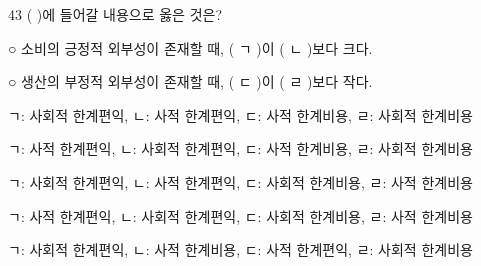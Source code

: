 \begin{question}{43}
( )에 들어갈 내용으로 옳은 것은?
\begin{framedtext}
○ 소비의 긍정적 외부성이 존재할 때, ( ㄱ )이 ( ㄴ )보다 크다. \par
○ 생산의 부정적 외부성이 존재할 때, ( ㄷ )이 ( ㄹ )보다 작다.
\end{framedtext}
\begin{choices}
  \item ㄱ: 사회적 한계편익, ㄴ: 사적 한계편익, ㄷ: 사적 한계비용, ㄹ: 사회적 한계비용
  \item ㄱ: 사적 한계편익, ㄴ: 사회적 한계편익, ㄷ: 사적 한계비용, ㄹ: 사회적 한계비용
  \item ㄱ: 사회적 한계편익, ㄴ: 사적 한계편익, ㄷ: 사회적 한계비용, ㄹ: 사적 한계비용
  \item ㄱ: 사적 한계편익, ㄴ: 사회적 한계편익, ㄷ: 사회적 한계비용, ㄹ: 사적 한계비용
  \item ㄱ: 사회적 한계편익, ㄴ: 사적 한계비용, ㄷ: 사적 한계편익, ㄹ: 사회적 한계비용
\end{choices}
\end{question}
